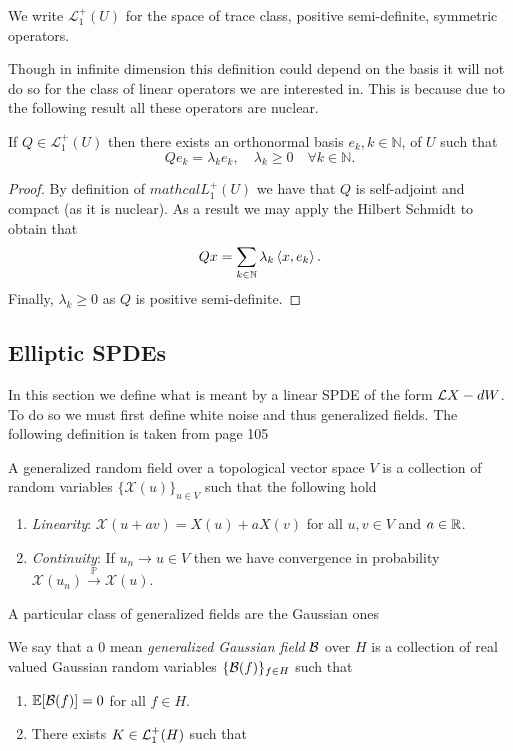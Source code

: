 \documentclass[
    a4paper,
    DIV=14,
    abstract=true,
    numbers=noenddot
]{scrartcl}
\begin{document}
\begin{definition}
	We write $\mathcal{L}_1^+(U)$ for the space of trace class, positive semi-definite, symmetric operators.
\end{definition}
Though in infinite dimension this definition could depend on the basis it will not do so for the class of linear operators we are interested in. This is because due to the following result all these operators are nuclear.
\begin{proposition}
	If $Q \in \mathcal{L}_1^+(U)$ then there exists an orthonormal basis $e_{k}, k \in \mathbb{N}$, of $U$ such that
	$$
		Q e_{k}=\lambda_{k} e_{k}, \quad \lambda_{k} \geq 0\quad \forall k \in \mathbb{N}.
	$$
\end{proposition}
\begin{proof}
	By definition of $mathcal{L}_1^+(U)$ we have that $Q$ is self-adjoint and compact (as it is nuclear).
	As a result we may apply the Hilbert Schmidt  to obtain that
	\begin{equation*}
		Q x=\sum_{k\in\mathbb{N}}\lambda_{k} \left\langle x,e_{k}\right\rangle.
	\end{equation*}
	Finally, $\lambda_k\geq 0$ as $Q$ is positive semi-definite.
\end{proof}
\subsection{Elliptic SPDEs}
In this section we define what is meant by a linear SPDE of the form $\mathcal{L} X-dW$. To do so we must first define white noise and thus generalized fields. The following definition is taken from \cite{lototsky2017stochastic} page 105
\begin{definition}
	A generalized random field over a topological vector space $V$ is a collection of random variables  $\{\mathcal{X}(u)\}_{u\in V}$ such that the following hold
	\begin{enumerate}
		\item \emph{Linearity}: $\mathcal{X}(u+av)=X(u)+aX(v)$ for all  $u,v\in V$ and $a\in \mathbb{R}$.
		\item \emph{Continuity}: If $u_n\to u\in V$ then we have convergence in probability $\mathcal{X}(u_n)\xrightarrow{\mathbb{P}}\mathcal{X}(u)$.
	\end{enumerate}
\end{definition}
A particular class of generalized fields are the Gaussian ones
\begin{definition}
	We say that a $0$ mean \emph{generalized Gaussian field} $\mathcal{B}$ over $H$ is a collection of real valued Gaussian random variables $\{\mathcal{B}(f)\}_{f\in H} $ such that
	\begin{enumerate}
		\item $\mathbb{E}[\mathcal{B}(f)]=0$ for all $f\in H$.
		\item There exists $K\in \mathcal{L}_1^+(H)$ such that
	\end{enumerate}
\end{definition}

\end{document}
